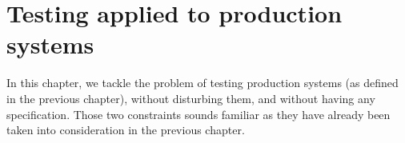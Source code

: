 %
\chapter{Testing applied to production systems}
\label{sec:testing}

In this chapter, we tackle the problem of testing production
systems (as defined in the previous chapter), without disturbing
them, and without having any specification. Those two constraints
sounds familiar as they have already been taken into
consideration in the previous chapter.\\

\minitoc







\cleardoublepage
\blankpage
